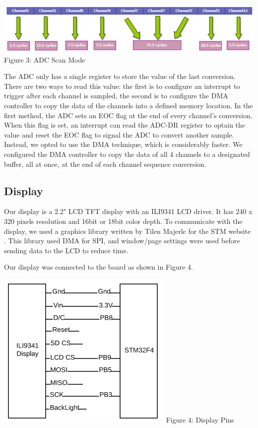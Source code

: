 \documentclass[twoside]{article}
\begin{document}
\begin{multicols}{2}
\begin{center}
\includegraphics[scale=0.43]{scanMode.png}
\newline Figure 3: ADC Scan Mode
\end{center}

The ADC only has a single register to store the value of the last conversion. There are two ways to read this value: the first is to configure an interrupt to trigger after each channel is sampled, the second is to configure the DMA controller to copy the data of the channels into a defined memory location\cite{ADCTutorial}. In the first method, the ADC sets an EOC flag at the end of every channel's conversion. When this flag is set, an interrupt can read the ADC-DR register to optain the value and reset the EOC flag to signal the ADC to convert another sample. Instead, we opted to use the DMA technique, which is considerably faster. We configured the DMA controller to copy the data of all 4 channels to a designated buffer, all at once, at 
the end of each channel sequence conversion. 

\subsection{Display}

Our display is a 2.2" LCD TFT display with an ILI9341 LCD driver. It has 240 x 320 pixels resolution and 16bit or 18bit color depth. To communicate with the display, we used a graphics library written by Tilen Majerle for the STM website \cite{library}. 
This library used DMA for SPI, and window/page settings were used before sending data to the LCD to reduce time. 

Our display was connected to the board as shown in Figure 4. 
\begin{center}
\includegraphics[scale=0.45]{displayPins.png}
\newline Figure 4: Display Pins
\end{center}


\end{multicols}
\end{document}
